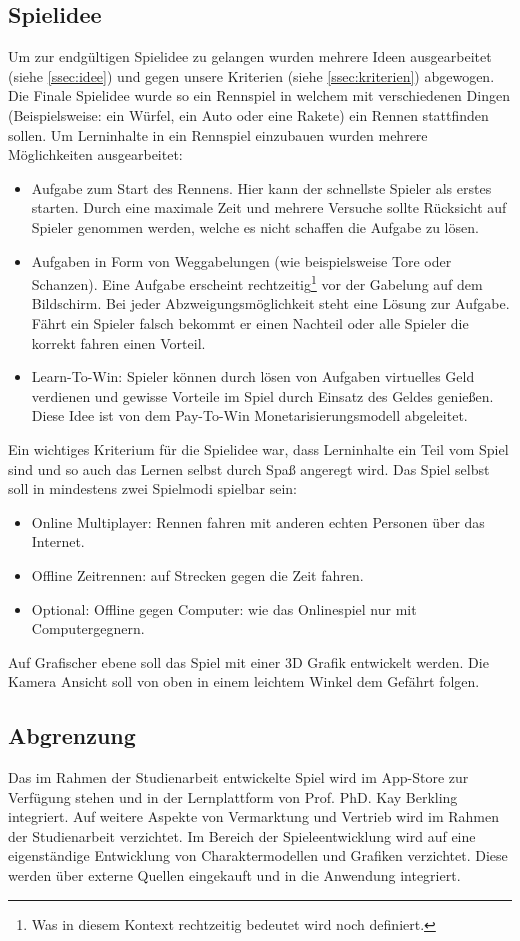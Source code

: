 \subsection{Spielidee}
	Um zur endgültigen Spielidee zu gelangen wurden mehrere Ideen ausgearbeitet (siehe \ref{ssec:idee}) und gegen unsere Kriterien (siehe \ref{ssec:kriterien}) abgewogen.
	Die Finale Spielidee wurde so ein Rennspiel in welchem mit verschiedenen Dingen (Beispielsweise: ein Würfel, ein Auto oder eine Rakete) ein Rennen stattfinden sollen. Um Lerninhalte in ein Rennspiel einzubauen wurden mehrere Möglichkeiten ausgearbeitet:
	\begin{itemize}
		\item{ Aufgabe zum Start des Rennens. Hier kann der schnellste Spieler als erstes starten. Durch eine maximale Zeit und mehrere Versuche sollte Rücksicht auf Spieler genommen werden, welche es nicht schaffen die Aufgabe zu lösen. }
		\item{ Aufgaben in Form von Weggabelungen (wie beispielsweise Tore oder Schanzen). Eine Aufgabe erscheint rechtzeitig\footnote{Was in diesem Kontext rechtzeitig bedeutet wird noch definiert.} vor der Gabelung auf dem Bildschirm. Bei jeder Abzweigungsmöglichkeit steht eine Lösung zur Aufgabe. Fährt ein Spieler falsch  bekommt er einen Nachteil oder alle Spieler die korrekt fahren einen Vorteil. }
		\item{ Learn-To-Win: Spieler können durch lösen von Aufgaben virtuelles Geld verdienen und gewisse Vorteile im Spiel durch Einsatz des Geldes genießen. Diese Idee ist von dem Pay-To-Win Monetarisierungsmodell abgeleitet. }
	\end{itemize}
	Ein wichtiges Kriterium für die Spielidee war, dass Lerninhalte ein Teil vom Spiel sind und so auch das Lernen selbst durch Spaß angeregt wird.
	Das Spiel selbst soll in mindestens zwei Spielmodi spielbar sein:
	\begin{itemize}
		\item{ Online Multiplayer: Rennen fahren mit anderen echten Personen über das Internet. }
		\item{ Offline Zeitrennen: auf Strecken gegen die Zeit fahren. }
		\item{ Optional: Offline gegen Computer: wie das Onlinespiel nur mit Computergegnern. }
	\end{itemize}
	Auf Grafischer ebene soll das Spiel mit einer 3D Grafik entwickelt werden. Die Kamera Ansicht soll von oben in einem leichtem Winkel dem Gefährt folgen.

\subsection{Abgrenzung}
	Das im Rahmen der Studienarbeit entwickelte Spiel wird im App-Store zur Verfügung stehen und in der Lernplattform von Prof. PhD. Kay Berkling integriert. Auf weitere Aspekte von Vermarktung und Vertrieb wird im Rahmen der Studienarbeit verzichtet.
	Im Bereich der Spieleentwicklung wird auf eine eigenständige Entwicklung von Charaktermodellen und Grafiken verzichtet. Diese werden über externe Quellen eingekauft und in die Anwendung integriert.

